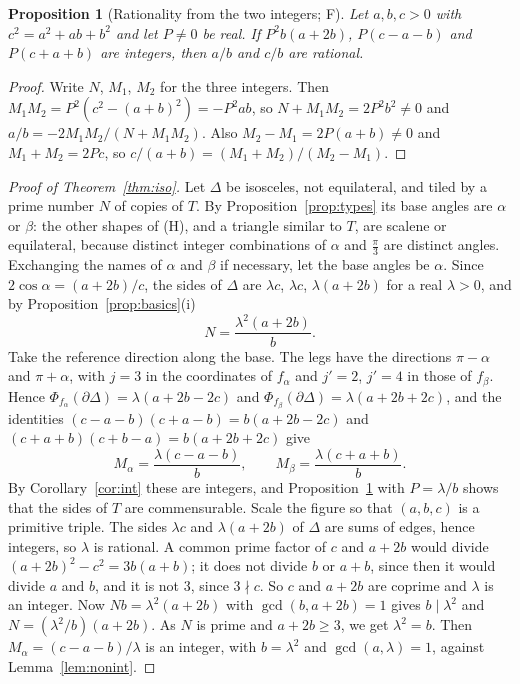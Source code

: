 \documentclass[11pt,reqno]{amsart}
\theoremstyle{plain}
\newtheorem{proposition}[theorem]{Proposition}
\theoremstyle{definition}
\newcommand{\sF}{\textup{\textsf{F}}}
\begin{document}
\begin{proposition}[Rationality from the two integers; \sF]\label{prop:rational}
Let $a,b,c>0$ with $c^2=a^2+ab+b^2$ and let $P\ne0$ be real. If $P^2b(a+2b)$, $P(c-a-b)$ and $P(c+a+b)$ are
integers, then $a/b$ and $c/b$ are rational.
\end{proposition}

\begin{proof}
Write $N$, $M_1$, $M_2$ for the three integers. Then $M_1M_2=P^2(c^2-(a+b)^2)=-P^2ab$, so
$N+M_1M_2=2P^2b^2\ne0$ and $a/b=-2M_1M_2/(N+M_1M_2)$. Also $M_2-M_1=2P(a+b)\ne0$ and $M_1+M_2=2Pc$, so
$c/(a+b)=(M_1+M_2)/(M_2-M_1)$.
\end{proof}

\begin{proof}[Proof of Theorem~\ref{thm:iso}]
Let $\Delta$ be isosceles, not equilateral, and tiled by a prime number $N$ of copies of $T$. By
Proposition~\ref{prop:types} its base angles are $\alpha$ or $\beta$: the other shapes of (H), and a
triangle similar to $T$, are scalene or equilateral, because distinct integer combinations of $\alpha$ and
$\frac\pi3$ are distinct angles. Exchanging the names of $\alpha$ and $\beta$ if necessary, let the base
angles be $\alpha$. Since $2\cos\alpha=(a+2b)/c$, the sides of $\Delta$ are $\lambda c$, $\lambda c$,
$\lambda(a+2b)$ for a real $\lambda>0$, and by Proposition~\ref{prop:basics}(i)
\[
N=\frac{\lambda^2(a+2b)}b .
\]
Take the reference direction along the base. The legs have the directions $\pi-\alpha$ and $\pi+\alpha$,
with $j=3$ in the coordinates of $f_\alpha$ and $j'=2$, $j'=4$ in those of $f_\beta$. Hence
$\Phi_{f_\alpha}(\partial\Delta)=\lambda(a+2b-2c)$ and $\Phi_{f_\beta}(\partial\Delta)=\lambda(a+2b+2c)$, and
the identities $(c-a-b)(c+a-b)=b(a+2b-2c)$ and $(c+a+b)(c+b-a)=b(a+2b+2c)$ give
\[
M_\alpha=\frac{\lambda(c-a-b)}b,\qquad M_\beta=\frac{\lambda(c+a+b)}b .
\]
By Corollary~\ref{cor:int} these are integers, and Proposition~\ref{prop:rational} with $P=\lambda/b$ shows
that the sides of $T$ are commensurable. Scale the figure so that $(a,b,c)$ is a primitive triple. The sides
$\lambda c$ and $\lambda(a+2b)$ of $\Delta$ are sums of edges, hence integers, so $\lambda$ is rational. A
common prime factor of $c$ and $a+2b$ would divide $(a+2b)^2-c^2=3b(a+b)$; it does not divide $b$ or $a+b$,
since then it would divide $a$ and $b$, and it is not $3$, since $3\nmid c$. So $c$ and $a+2b$ are coprime
and $\lambda$ is an integer. Now $Nb=\lambda^2(a+2b)$ with $\gcd(b,a+2b)=1$ gives
$b\mid\lambda^2$ and $N=(\lambda^2/b)(a+2b)$. As $N$ is prime and $a+2b\ge3$, we get $\lambda^2=b$. Then
$M_\alpha=(c-a-b)/\lambda$ is an integer, with $b=\lambda^2$ and $\gcd(a,\lambda)=1$, against
Lemma~\ref{lem:nonint}.
\end{proof}
\end{document}
